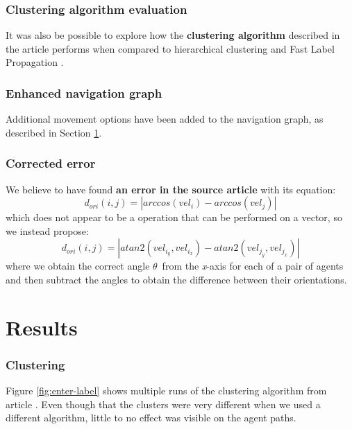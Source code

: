 \documentclass[9pt]{pnas-new}
\begin{document}
\subsubsection{Clustering algorithm evaluation}
It was also be possible to explore how the \textbf{clustering algorithm} described in the article performs when compared to hierarchical clustering and Fast Label Propagation \cite{Lovre_2023}.


\subsubsection{Enhanced navigation graph} Additional movement options have been added to the navigation graph, as described in Section \ref{res}.


\subsubsection{Corrected error}
We believe to have found \textbf{an error in the source article} with its equation: \begin{equation*}
    d_{ori}(i,j)=|arccos(vel_i)-arccos(vel_j)|
\end{equation*}
which does not appear to be a operation that can be performed on a vector, so we instead propose: \begin{equation*}
    d_{ori}(i,j)=|atan2(vel_{i_y},vel_{i_x})-atan2(vel_{j_y},vel_{j_x})|
\end{equation*}
where we obtain the correct angle ${\theta}$\ from the \textit{x}-axis \cite{wikiatan2} for each of a pair of agents and then subtract the angles to obtain the difference between their orientations.

\section{Results} \label{res}
\subsubsection{Clustering}
Figure \ref{fig:enter-label} shows multiple runs of the clustering algorithm from article \cite{Wu_Huang_Tian_Yan_Yu_2024}. Even though that the clusters were very different when we used a different algorithm, little to no effect was visible on the agent paths.
\end{document}
